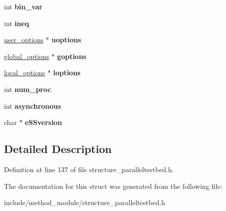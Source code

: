 \begin{DoxyCompactItemize}
\item 
\hypertarget{structexperiment__method__ScatterSearch_ab751ca4719b6afd026dd64b76de55341}{int {\bfseries bin\-\_\-var}}\label{structexperiment__method__ScatterSearch_ab751ca4719b6afd026dd64b76de55341}

\item 
\hypertarget{structexperiment__method__ScatterSearch_a9f5f16100c1ad32086f72e0d6875857b}{int {\bfseries ineq}}\label{structexperiment__method__ScatterSearch_a9f5f16100c1ad32086f72e0d6875857b}

\item 
\hypertarget{structexperiment__method__ScatterSearch_a602c548a382ddf0bc42e3756905b0386}{\hyperlink{structuser__options}{user\-\_\-options} $\ast$ {\bfseries uoptions}}\label{structexperiment__method__ScatterSearch_a602c548a382ddf0bc42e3756905b0386}

\item 
\hypertarget{structexperiment__method__ScatterSearch_a9e1c5feeac293b70ed623be4212a692d}{\hyperlink{structglobal__options}{global\-\_\-options} $\ast$ {\bfseries goptions}}\label{structexperiment__method__ScatterSearch_a9e1c5feeac293b70ed623be4212a692d}

\item 
\hypertarget{structexperiment__method__ScatterSearch_a5dc3d5137bd2be482fa3f39bedfad2a6}{\hyperlink{structlocal__options}{local\-\_\-options} $\ast$ {\bfseries loptions}}\label{structexperiment__method__ScatterSearch_a5dc3d5137bd2be482fa3f39bedfad2a6}

\item 
\hypertarget{structexperiment__method__ScatterSearch_abb011c1f4d5afef6efd0c7824f98cd6b}{int {\bfseries num\-\_\-proc}}\label{structexperiment__method__ScatterSearch_abb011c1f4d5afef6efd0c7824f98cd6b}

\item 
\hypertarget{structexperiment__method__ScatterSearch_ae02b9b69c6c15c1f432f8628085b8a70}{int {\bfseries asynchronous}}\label{structexperiment__method__ScatterSearch_ae02b9b69c6c15c1f432f8628085b8a70}

\item 
\hypertarget{structexperiment__method__ScatterSearch_ac6adaf24fe70930317844eeb21ad399f}{char $\ast$ {\bfseries e\-S\-Sversion}}\label{structexperiment__method__ScatterSearch_ac6adaf24fe70930317844eeb21ad399f}

\end{DoxyCompactItemize}


\subsection{Detailed Description}


Definition at line 137 of file structure\-\_\-paralleltestbed.\-h.



The documentation for this struct was generated from the following file\-:\begin{DoxyCompactItemize}
\item 
include/method\-\_\-module/structure\-\_\-paralleltestbed.\-h\end{DoxyCompactItemize}
